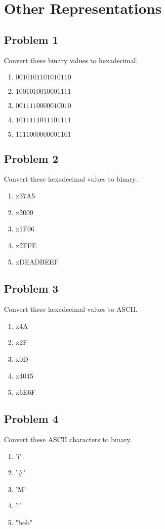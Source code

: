 \documentclass{article}
\begin{document}
\section*{Other Representations}
\subsection*{Problem 1}
Convert these binary values to hexadecimal.
\begin{enumerate}[label=\alph*.]
    \item $0010 1011 0101 0110$
    \item $1001 0100 1000 1111$
    \item $0011 1100 0001 0010$
    \item $1011 1110 1110 1111$
    \item $1111 0000 0000 1101$
\end{enumerate}

\subsection*{Problem 2}
Convert these hexadecimal values to binary.
\begin{enumerate}[label=\alph*.]
    \item x37A5
    \item x2009
    \item x1F06
    \item x2FFE
    \item xDEADBEEF
\end{enumerate}

\subsection*{Problem 3}
Convert these hexadecimal values to ASCII.
\begin{enumerate}[label=\alph*.]
    \item x4A
    \item x2F
    \item x0D
    \item x4045
    \item x6E6F
\end{enumerate}

\subsection*{Problem 4}
Convert these ASCII characters to binary.
\begin{enumerate}[label=\alph*.]
    \item 'i'
    \item '#'
    \item 'M'
    \item '!'
    \item "bob"
\end{enumerate}
\end{document}
